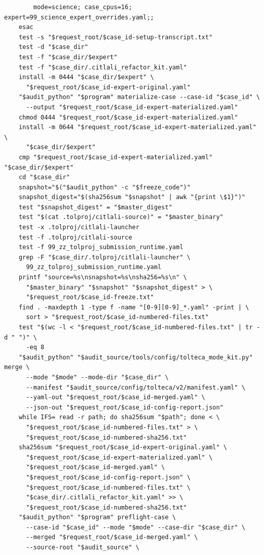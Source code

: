\documentclass[11pt]{article}
\begin{document}
\begin{small}
\begin{verbatim}
        mode=science; case_cpus=16; expert=99_science_expert_overrides.yaml;;
    esac
    test -s "$request_root/$case_id-setup-transcript.txt"
    test -d "$case_dir"
    test -f "$case_dir/$expert"
    test -f "$case_dir/.citlali_refactor_kit.yaml"
    install -m 0444 "$case_dir/$expert" \
      "$request_root/$case_id-expert-original.yaml"
    "$audit_python" "$program" materialize-case --case-id "$case_id" \
      --output "$request_root/$case_id-expert-materialized.yaml"
    chmod 0444 "$request_root/$case_id-expert-materialized.yaml"
    install -m 0644 "$request_root/$case_id-expert-materialized.yaml" \
      "$case_dir/$expert"
    cmp "$request_root/$case_id-expert-materialized.yaml" "$case_dir/$expert"
    cd "$case_dir"
    snapshot="$("$audit_python" -c "$freeze_code")"
    snapshot_digest="$(sha256sum "$snapshot" | awk "{print \$1}")"
    test "$snapshot_digest" = "$master_digest"
    test "$(cat .tolproj/citlali-source)" = "$master_binary"
    test -x .tolproj/citlali-launcher
    test -f .tolproj/citlali-source
    test -f 99_zz_tolproj_submission_runtime.yaml
    grep -F "$case_dir/.tolproj/citlali-launcher" \
      99_zz_tolproj_submission_runtime.yaml
    printf "source=%s\nsnapshot=%s\nsha256=%s\n" \
      "$master_binary" "$snapshot" "$snapshot_digest" > \
      "$request_root/$case_id-freeze.txt"
    find . -maxdepth 1 -type f -name "[0-9][0-9]_*.yaml" -print | \
      sort > "$request_root/$case_id-numbered-files.txt"
    test "$(wc -l < "$request_root/$case_id-numbered-files.txt" | tr -d " ")" \
      -eq 8
    "$audit_python" "$audit_source/tools/config/tolteca_mode_kit.py" merge \
      --mode "$mode" --mode-dir "$case_dir" \
      --manifest "$audit_source/config/tolteca/v2/manifest.yaml" \
      --yaml-out "$request_root/$case_id-merged.yaml" \
      --json-out "$request_root/$case_id-config-report.json"
    while IFS= read -r path; do sha256sum "$path"; done < \
      "$request_root/$case_id-numbered-files.txt" > \
      "$request_root/$case_id-numbered-sha256.txt"
    sha256sum "$request_root/$case_id-expert-original.yaml" \
      "$request_root/$case_id-expert-materialized.yaml" \
      "$request_root/$case_id-merged.yaml" \
      "$request_root/$case_id-config-report.json" \
      "$request_root/$case_id-numbered-files.txt" \
      "$case_dir/.citlali_refactor_kit.yaml" >> \
      "$request_root/$case_id-numbered-sha256.txt"
    "$audit_python" "$program" preflight-case \
      --case-id "$case_id" --mode "$mode" --case-dir "$case_dir" \
      --merged "$request_root/$case_id-merged.yaml" \
      --source-root "$audit_source" \

\end{verbatim}
\end{small}
\end{document}
